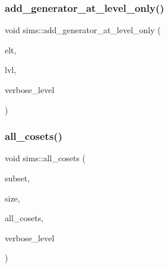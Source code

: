 \mbox{\label{classsims_aed07e3f4041b31d62479ed90c4cc88c8}} 
\subsubsection{\texorpdfstring{add\+\_\+generator\+\_\+at\+\_\+level\+\_\+only()}{add\_generator\_at\_level\_only()}}
{\footnotesize\ttfamily void sims\+::add\+\_\+generator\+\_\+at\+\_\+level\+\_\+only (\begin{DoxyParamCaption}\item[{\mbox{\hyperlink{galois_8h_a09fddde158a3a20bd2dcadb609de11dc}{I\+NT}} $\ast$}]{elt,  }\item[{\mbox{\hyperlink{galois_8h_a09fddde158a3a20bd2dcadb609de11dc}{I\+NT}}}]{lvl,  }\item[{\mbox{\hyperlink{galois_8h_a09fddde158a3a20bd2dcadb609de11dc}{I\+NT}}}]{verbose\+\_\+level }\end{DoxyParamCaption})}

\mbox{\label{classsims_a55ca54637b837b2c84ca79851d857429}} 
\subsubsection{\texorpdfstring{all\+\_\+cosets()}{all\_cosets()}}
{\footnotesize\ttfamily void sims\+::all\+\_\+cosets (\begin{DoxyParamCaption}\item[{\mbox{\hyperlink{galois_8h_a09fddde158a3a20bd2dcadb609de11dc}{I\+NT}} $\ast$}]{subset,  }\item[{\mbox{\hyperlink{galois_8h_a09fddde158a3a20bd2dcadb609de11dc}{I\+NT}}}]{size,  }\item[{\mbox{\hyperlink{galois_8h_a09fddde158a3a20bd2dcadb609de11dc}{I\+NT}} $\ast$}]{all\+\_\+cosets,  }\item[{\mbox{\hyperlink{galois_8h_a09fddde158a3a20bd2dcadb609de11dc}{I\+NT}}}]{verbose\+\_\+level }\end{DoxyParamCaption})}

\mbox{\label{classsims_ae172f57a02f7c9f6e41163897ccbdb4c}} 
